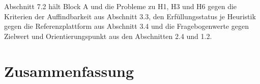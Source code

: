 Abschnitt 7.2 hält Block A und die Probleme zu H1, H3 und H6 gegen die Kriterien der Auffindbarkeit aus Abschnitt 3.3, den Erfüllungsstatus je Heuristik gegen die Referenzplattform aus Abschnitt 3.4 und die Fragebogenwerte gegen Zielwert und Orientierungspunkt aus den Abschnitten 2.4 und 1.2.

\section{Zusammenfassung}
\label{sec:zusammenfassung-test}

